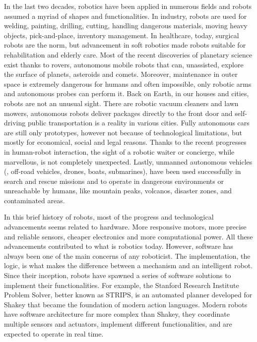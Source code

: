In the last two decades, robotics have been applied in numerous fields and robots assumed a myriad of shapes and functionalities. In industry, robots are used for welding, painting, drilling, cutting, handling dangerous materials, moving heavy objects, pick-and-place, inventory management. In healthcare, today, surgical robots are the norm, but advancement in soft robotics made robots suitable for rehabilitation and elderly care. Most of the recent discoveries of planetary science exist thanks to rovers, autonomous mobile robots that can, unassisted, explore the surface of planets, asteroids and comets. Moreover, maintenance in outer space is extremely dangerous for humans and often impossible, only robotic arms and autonomous probes can perform it. Back on Earth, in our houses and cities, robots are not an unusual sight. There are robotic vacuum cleaners and lawn mowers,  autonomous robots deliver packages directly to the front door and self-driving public transportation is a reality in various cities. Fully autonomous cars are still only prototypes, however not because of technological limitations, but mostly for economical, social and legal reasons. Thanks to the recent progresses in human-robot interaction, the sight of a robotic waiter or concierge, while marvellous, is not completely unexpected. Lastly, unmanned autonomous vehicles (\eg, off-road vehicles, drones, boats, submarines),  have been used successfully in search and rescue missions and to operate in dangerous environments or unreachable by humans, like mountain peaks, volcanos, disaster zones, and contaminated areas.

In this brief history of robots, most of the progress and technological advancements seems related to hardware. More responsive motors, more precise and reliable sensors, cheaper electronics and more computational power. All these advancements contributed to what is robotics today. However, software has always been one of the main concerns of any roboticist. The implementation, the logic, is what makes the difference between a mechanism and an intelligent robot. Since their inception, robots have spawned a series of software solutions to implement their functionalities. For example, the Stanford Research Institute Problem Solver, better known as STRIPS, is an automated planner developed for Shakey that became the foundation of modern action languages. Modern robots have software architecture far more complex than Shakey, they coordinate multiple sensors and actuators,  implement different functionalities, and are expected to operate in real time.

